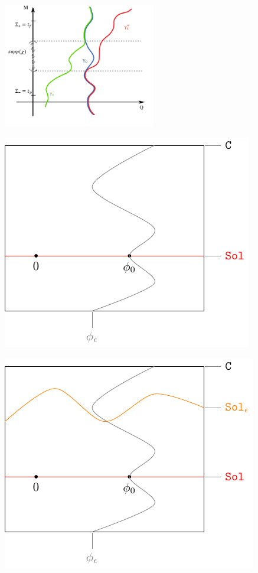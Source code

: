 \documentclass[Main]{subfiles}
\begin{document}
	\includegraphics[width=0.5\textwidth]{./Pictures/AdvRetSol}
	
	\includegraphics[width=\textwidth]{Pictures/GeometricPicture0}
				
	\includegraphics[width=\textwidth]{Pictures/GeometricPicture1}
				
\end{document}
